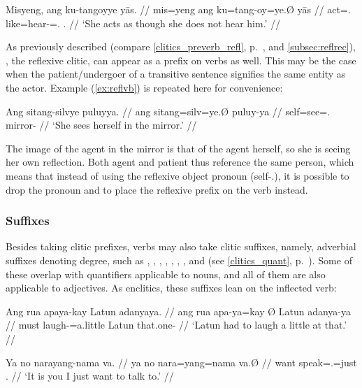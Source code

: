 \ex\begingl
	\gla Misyeng, ang ku-tangoyye yās. //
	\glb mis=yeng ang ku=tang-oy=ye.Ø yās //
	\glc act=\TsgF{}.\Aarg{} \AgtT{} like=hear-\Neg{}=\TsgF{}.\Top{} 
		\TsgM{}.\Parg{} //
	\glft `She acts as though she does not hear him.' //
\endgl\xe

As previously described (compare \autoref{clitics_preverb_refl},
p.~\pageref{clitics_preverb_refl}, and \ref{subsec:reflrec}),
, the reflexive clitic, can appear as a prefix on
verbs as well. This may be the case when the patient/undergoer of a
transitive sentence signifies the same entity as the actor. Example
(\ref{ex:reflvb}) is repeated here for convenience:

\ex\begingl
	\gla Ang sitang-silvye puluyya. //
	\glb ang sitang=silv=ye.Ø puluy-ya //
	\glc \AgtT{} self=see=\TsgF{}.\Top{} mirror-\Loc{} //
	\glft `She sees herself in the mirror.' //
\endgl\xe

The image of the agent in the mirror is that of the agent herself, so she is
seeing her own reflection. Both agent and patient thus reference the same
person, which means that instead of using the reflexive object pronoun
 (self-\TsgF{}.\Parg{}), it is possible
to drop the pronoun and to place the reflexive prefix on the verb instead.

\subsubsection{Suffixes}

Besides taking clitic prefixes, verbs may also take clitic suffixes, namely,
adverbial suffixes denoting degree, such as ,
, ,  , ,  ,
, and   (see
\autoref{clitics_quant}, p.~\pageref{clitics_quant}). Some of these overlap
with quantifiers applicable to nouns, and all of them are also applicable to
adjectives. As enclitics, these suffixes lean on the inflected verb:

\pex
\a\label{ex:verbquant}\begingl
	\gla Ang rua apaya-kay {} Latun adanyaya. //
	\glb ang rua apa-ya=kay Ø Latun adanya-ya //
	\glc \AgtT{} must laugh-\TsgM{}=a.little \Top{} Latun that.one-\Loc{} //
	\glft `Latun had to laugh a little at that.' //
\endgl

\a\begingl
	\gla Ya no narayang-nama va. //
	\glb ya no nara=yang=nama va.Ø //
	\glc \LocT{} want speak=\Fsg{}.\Aarg{}=just \Ssg{}.\Top{} //
	\glft `It is you I just want to talk to.' //
\endgl
\xe

